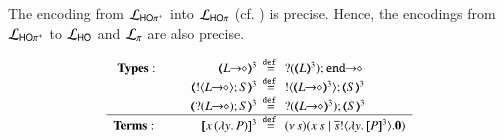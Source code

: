 \smallskip 

\begin{theorem}
\label{f:enc:hopiptohopi}
The encoding from $\mathcal{L}_{\mathsf{HO\pi^{+}}}$ into $\mathcal{L}_{\mathsf{HO}\pi}$ (cf. )
is precise. Hence, the encodings 
from $\mathcal{L}_{\mathsf{HO\pi^{+}}}$ to $\mathcal{L}_{\mathsf{HO}}$ 
and $\mathcal{L}_{\pi}$ 
are also precise. 
\end{theorem}
\smallskip 

\begin{figure}[t]
\[
{\small
\begin{array}{rcll}
\noindent{\bf Types:} \ \hspace{1.5cm}  
		\tmap{\shot{L}}{3} &\!\!\!\!\defeq\!\!\!\!& \shot{\btinp{\tmap{L}{3}} \tinact}
		\\
		\tmap{\btout{\shot{L}} S}{3} &\!\!\!\!\defeq\!\!\!\!& \btout{\tmap{\shot{L}}{3}} \tmap{S}{3}
		\\
		\tmap{\btinp{\shot{L}} S}{3} &\!\!\!\!\defeq\!\!\!\!& \btinp{\tmap{\shot{L}}{3}} \tmap{S}{3}
\\
\hline
{\bf Terms}: \hspace{1.1cm} 
\pmap{\appl{x}{(\abs{y} P)}}{3} &
\!\!\!\!\defeq\!\!\!\!& 
\newsp{s}{\appl{x}{s} \Par \bout{\dual{s}}{\abs{y} \pmap{P}{3}} \inact}
		\\


\end{array}}\]
\end{figure}
